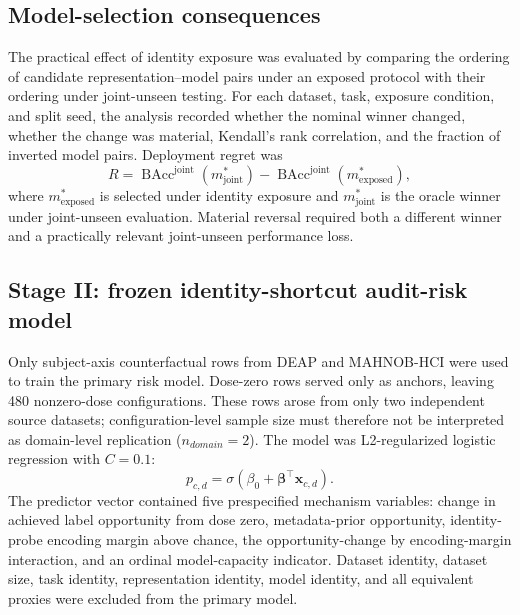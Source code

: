 \documentclass[preprint,12pt]{elsarticle}
\begin{document}
\subsection{Model-selection consequences}
\label{subsec:ranking}

The practical effect of identity exposure was evaluated by comparing the ordering of candidate representation--model pairs under an exposed protocol with their ordering under joint-unseen testing. For each dataset, task, exposure condition, and split seed, the analysis recorded whether the nominal winner changed, whether the change was material, Kendall's rank correlation, and the fraction of inverted model pairs. Deployment regret was
\begin{equation}
R=\operatorname{BAcc}^{\mathrm{joint}}(m^*_{\mathrm{joint}})-\operatorname{BAcc}^{\mathrm{joint}}(m^*_{\mathrm{exposed}}),
\end{equation}
where $m^*_{\mathrm{exposed}}$ is selected under identity exposure and $m^*_{\mathrm{joint}}$ is the oracle winner under joint-unseen evaluation. Material reversal required both a different winner and a practically relevant joint-unseen performance loss.

\subsection{Stage II: frozen identity-shortcut audit-risk model}
\label{subsec:riskmodel}

Only subject-axis counterfactual rows from DEAP and MAHNOB-HCI were used to train the primary risk model. Dose-zero rows served only as anchors, leaving 480 nonzero-dose configurations. These rows arose from only two independent source datasets; configuration-level sample size must therefore not be interpreted as domain-level replication ($n_{domain}=2$). The model was L2-regularized logistic regression with $C=0.1$:
\begin{equation}
p_{c,d}=\sigma\left(\beta_0+\boldsymbol{\beta}^{\top}\mathbf{x}_{c,d}\right).
\end{equation}
The predictor vector contained five prespecified mechanism variables: change in achieved label opportunity from dose zero, metadata-prior opportunity, identity-probe encoding margin above chance, the opportunity-change by encoding-margin interaction, and an ordinal model-capacity indicator. Dataset identity, dataset size, task identity, representation identity, model identity, and all equivalent proxies were excluded from the primary model.
\end{document}
